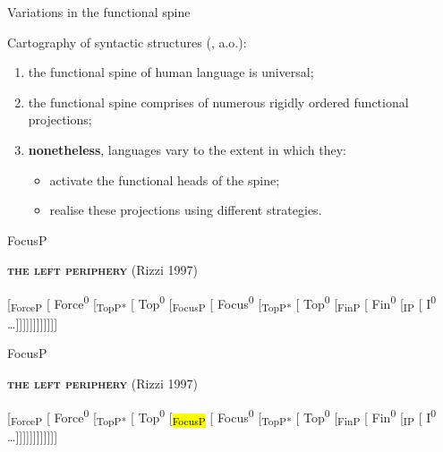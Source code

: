 \documentclass[lesson_slides]{subfiles}
\begin{document}
\begin{frame}[c]{Variations in the functional spine}

    \noindent Cartography of syntactic structures (\citealt{cinquerizzi2010,rizzicinque2016}, a.o.): \pause
    \begin{enumerate}
        \item the functional spine of human language is universal; \pause
        \item the functional spine comprises of numerous rigidly ordered functional projections; \pause
        \item \textbf{nonetheless}, languages vary to the extent in which they: \pause
            \begin{itemize}
                \item[\ding{227}] activate the functional heads of the spine; \pause
                \item[\ding{227}] realise these projections using different strategies. 
            \end{itemize}
    \end{enumerate}

\end{frame}
    \begin{frame}[c]{FocusP}
    
    \textbf{\textsc{the left periphery}} (Rizzi 1997)
    
    [\textsubscript{ForceP} [ Force\textsuperscript{0} [\textsubscript{TopP*} [ Top\textsuperscript{0} [\textsubscript{FocusP} [ Focus\textsuperscript{0} [\textsubscript{TopP*} [ Top\textsuperscript{0} [\textsubscript{FinP} [ Fin\textsuperscript{0} [\textsubscript{IP} [ I\textsuperscript{0} \dots ]]]]]]]]]]]]
      
    \end{frame}
\begin{frame}[c]{FocusP}

\textbf{\textsc{the left periphery}} (Rizzi 1997)

[\textsubscript{ForceP} [ Force\textsuperscript{0} [\textsubscript{TopP*} [ Top\textsuperscript{0} [\textsubscript{\hl{FocusP}} [ Focus\textsuperscript{0} [\textsubscript{TopP*} [ Top\textsuperscript{0} [\textsubscript{FinP} [ Fin\textsuperscript{0} [\textsubscript{IP} [ I\textsuperscript{0} \dots ]]]]]]]]]]]]


  
\end{frame}
\end{document}

